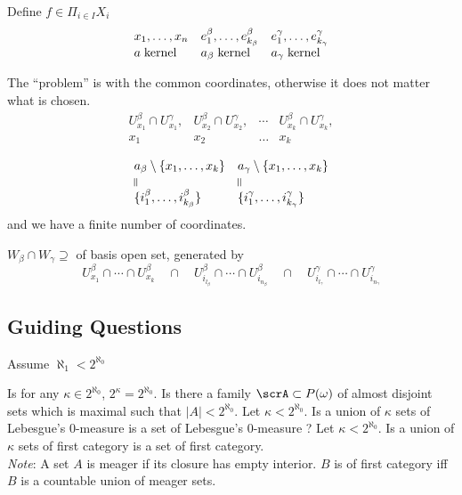 \documentclass[11pt,pdftex,twoside,a4paper]{article}
\begin{document}
Define \(f\in \Pi_{i\in I} X_i\)
\begin{equation*}
\begin{array}{lll}
x_1,\ldots,x_n & 
  e_1^\beta,\ldots,e_{k_\beta}^\beta & e_1^\gamma,\ldots,e_{k_\gamma}^\gamma
\\
a\;\textnormal{kernel} & 
  a_\beta\; \textnormal{kernel} & a_\gamma\;\textnormal{kernel} 
\end{array}
\end{equation*}

The ``problem'' is with the common coordinates, otherwise
it does not matter what is chosen.
\begin{equation*}
 \begin{array}{llll}
 U_{x_1}^\beta \cap U_{x_1}^\gamma, &
 U_{x_2}^\beta \cap U_{x_2}^\gamma, &
 \cdots &
 U_{x_k}^\beta \cap U_{x_k}^\gamma, \\
 x_1 & x_2 & \ldots & x_k
 \end{array}
\end{equation*}

\begin{equation*}
\begin{array}{ll}
a_\beta \setminus\{x_1,\ldots,x_k\}  & a_\gamma \setminus\{x_1,\ldots,x_k\} \\
\rotatebox[origin=c]{90}{\(=\)} & \rotatebox[origin=c]{90}{\(=\)} \\
\{i_1^\beta, \ldots, i_{k_\beta}^\beta\} & \{i_1^\gamma, \ldots, i_{k_\gamma}^\gamma \}
\end{array}
\end{equation*}
and we have a finite number of coordinates.

\(W_\beta \cap W_\gamma \supseteq\)  of basis open set, generated by
\begin{equation*}
U_{x_1}^\beta \cap \cdots \cap U_{x_k}^\beta 
  \quad \cap \quad 
  U_{i_{l_\beta}}^\beta \cap \cdots \cap  U_{i_{n_\beta}}^\beta
  \quad \cap \quad 
  U_{i_{l_\gamma}}^\gamma \cap \cdots \cap  U_{i_{n_\gamma}}^\gamma
\end{equation*}

\subsection{Guiding Questions}

Assume \(\aleph_1 < 2^{\aleph_0}\)
\begin{itemize}
 Is for any \(\kappa \in 2^{\aleph_0}\), \(2^\kappa = 2^{\aleph_0}\).
 Is there a family \(\scrA \subset P(\omega)\)
of almost disjoint sets which is maximal such that \(|A| < 2^{\aleph_0}\).
 Let \(\kappa < 2^{\aleph_0}\). Is a union of \(\kappa\)
sets of Lebesgue's $0$-measure is a set of Lebesgue's $0$-measure ?
 Let \(\kappa < 2^{\aleph_0}\). 
Is a union of \(\kappa\) sets of first category is a set of first category.
\\
\emph{Note}: A set $A$ is meager if its closure has empty interior.
$B$ is of first category iff $B$ is a countable union of meager sets.
\end{itemize}
\end{document}
